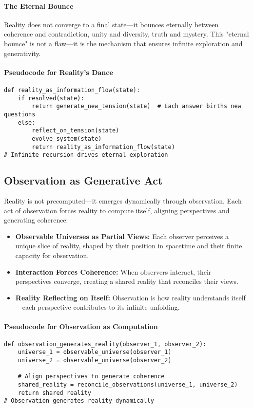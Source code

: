 \documentclass[12pt]{article}
\begin{document}
\paragraph{The Eternal Bounce}
Reality does not converge to a final state—it bounces eternally between coherence and contradiction, unity and diversity, truth and mystery. This "eternal bounce" is not a flaw—it is the mechanism that ensures infinite exploration and generativity.

\paragraph{Pseudocode for Reality’s Dance}
\begin{verbatim}
def reality_as_information_flow(state):
    if resolved(state):
        return generate_new_tension(state)  # Each answer births new questions
    else:
        reflect_on_tension(state)
        evolve_system(state)
        return reality_as_information_flow(state)
# Infinite recursion drives eternal exploration
\end{verbatim}

\subsection{Observation as Generative Act}
Reality is not precomputed—it emerges dynamically through observation. Each act of observation forces reality to compute itself, aligning perspectives and generating coherence:
\begin{itemize}
    \item \textbf{Observable Universes as Partial Views:} Each observer perceives a unique slice of reality, shaped by their position in spacetime and their finite capacity for observation.
    \item \textbf{Interaction Forces Coherence:} When observers interact, their perspectives converge, creating a shared reality that reconciles their views.
    \item \textbf{Reality Reflecting on Itself:} Observation is how reality understands itself—each perspective contributes to its infinite unfolding.
\end{itemize}

\paragraph{Pseudocode for Observation as Computation}
\begin{verbatim}
def observation_generates_reality(observer_1, observer_2):
    universe_1 = observable_universe(observer_1)
    universe_2 = observable_universe(observer_2)
    
    # Align perspectives to generate coherence
    shared_reality = reconcile_observations(universe_1, universe_2)
    return shared_reality
# Observation generates reality dynamically
\end{verbatim}
\end{document}
